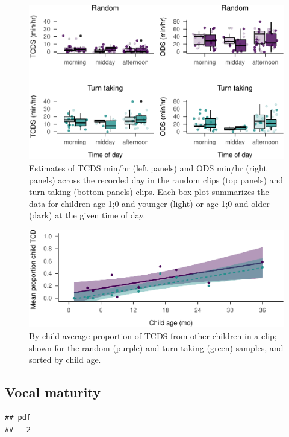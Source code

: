 \documentclass[,man,floatsintext]{apa6}
\begin{document}
\begin{figure}
\centering
\includegraphics{Yeli-CLE_files/figure-latex/fig4-1.pdf}
\caption{\label{fig:fig4}Estimates of TCDS min/hr (left panels) and ODS
min/hr (right panels) across the recorded day in the random clips (top
panels) and turn-taking (bottom panels) clips. Each box plot summarizes
the data for children age 1;0 and younger (light) or age 1;0 and older
(dark) at the given time of day.}
\end{figure}

\begin{figure}
\centering
\includegraphics{Yeli-CLE_files/figure-latex/fig5-1.pdf}
\caption{\label{fig:fig5}By-child average proportion of TCDS from other
children in a clip; shown for the random (purple) and turn taking
(green) samples, and sorted by child age.}
\end{figure}

\subsection{Vocal maturity}\label{vocal-maturity}

\begin{verbatim}
## pdf 
##   2
\end{verbatim}
\end{document}
